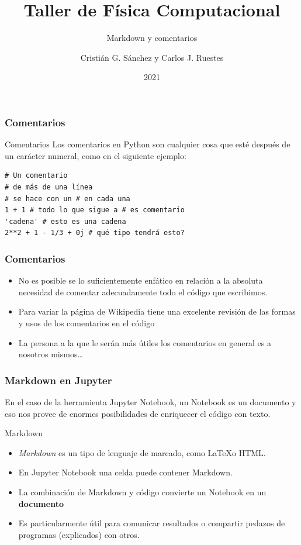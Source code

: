 \documentclass{beamer}
\title{Taller de Física Computacional}
\subtitle{Markdown y comentarios}
\author{Cristián G. Sánchez y Carlos J. Ruestes}
\date{2021}
\begin{document}
\frame{\titlepage}

\begin{frame}[fragile]
\frametitle{Comentarios}
\begin{block}{Comentarios}
Los comentarios en Python son cualquier cosa que esté después de un carácter numeral, como en el siguiente ejemplo:
\begin{verbatim}
# Un comentario
# de más de una línea
# se hace con un # en cada una
1 + 1 # todo lo que sigue a # es comentario
'cadena' # esto es una cadena
2**2 + 1 - 1/3 + 0j # qué tipo tendrá esto?
\end{verbatim}
\end{block}
\end{frame}

\begin{frame}[fragile]
\frametitle{Comentarios}
\begin{itemize}
\item No es posible se lo suficientemente enfático en relación a la \alert{absoluta} necesidad de comentar adecuadamente 
todo el código que escribimos.
\item Para variar la página de Wikipedia tiene una excelente revisión de las formas y usos de los comentarios en el código
\item La persona a la que le serán más útiles los comentarios en general es a nosotros mismos\ldots
\end{itemize}
\end{frame}

\begin{frame}[fragile]
\frametitle{Markdown en Jupyter}
En el caso de la herramienta Jupyter Notebook, un Notebook es un \alert{documento} y eso nos provee de enormes
posibilidades de enriquecer el código con texto.
\begin{block}{Markdown}
\begin{itemize}
\item {\em Markdown} es un tipo de lenguaje de marcado, como \LaTeX o HTML.
\item En Jupyter Notebook una celda puede contener Markdown.
\item La combinación de Markdown y código convierte un Notebook en un {\bf documento}
\item Es particularmente útil para comunicar resultados o compartir pedazos de programas (explicados) con otros.
\end{itemize}
\end{block}
\end{frame}
\end{document}
